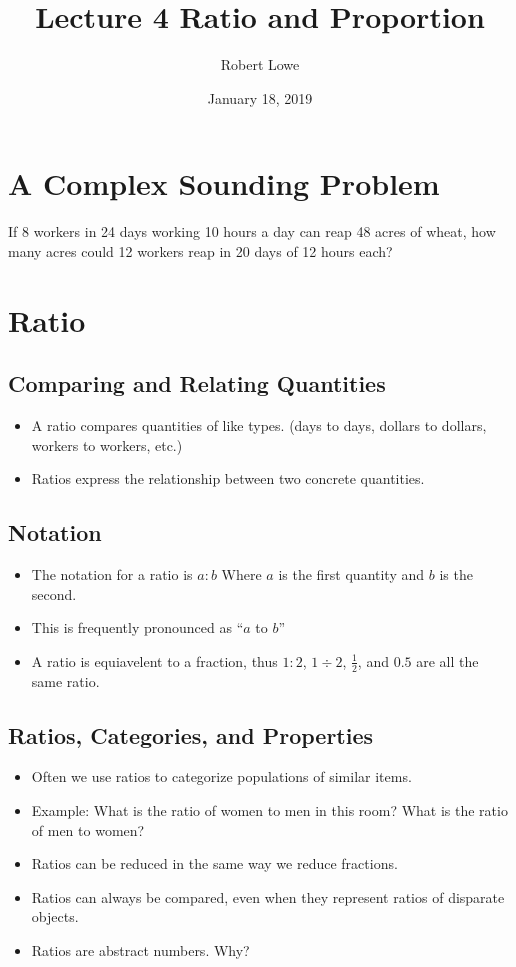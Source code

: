\documentclass{article}
\title{Lecture 4 Ratio and Proportion}
\author{Robert Lowe}
\date{January 18, 2019}
\begin{document}
\maketitle
\section*{A Complex Sounding Problem}
If 8 workers in 24 days working 10 hours a day can reap 48 acres of wheat, how many acres could 12 workers reap in 20 days of 12 hours each?

\section*{Ratio}
\subsection*{Comparing and Relating Quantities}
\begin{itemize}
    \item A ratio compares quantities of like types. (days to days, dollars to dollars, 
    workers to workers, etc.)
    \item Ratios express the relationship between two concrete quantities.
\end{itemize}

\subsection*{Notation}
\begin{itemize}
    \item The notation for a ratio is $a:b$ Where $a$ is the first quantity and $b$ is the second.
    \item This is frequently pronounced as ``$a$ to $b$''
    \item A ratio is equiavelent to a fraction, thus $1:2$, $1\div 2$, $\frac{1}{2}$, and $0.5$ are all the same ratio.
\end{itemize}

\subsection*{Ratios, Categories, and Properties}
\begin{itemize}
    \item Often we use ratios to categorize populations of similar items.
    \item Example:  What is the ratio of women to men in this room? What is the ratio of men to women?
    \item Ratios can be reduced in the same way we reduce fractions.
    \item Ratios can always be compared, even when they represent ratios of disparate objects.
    \item Ratios are abstract numbers. Why?
\end{itemize}
\end{document}
